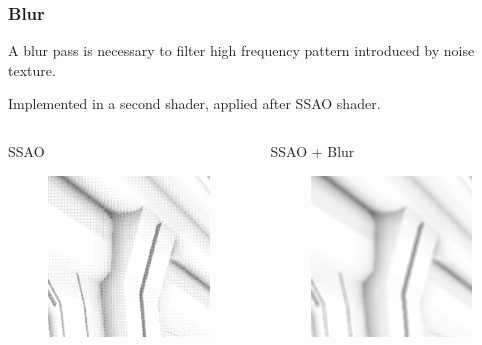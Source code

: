 \documentclass{beamer}
\newcommand{\redtext}[1]{\textcolor{myred}{#1}}
\begin{document}
\begin{frame}
\frametitle{Blur}
A blur pass is necessary to \redtext{filter} high frequency pattern introduced by noise texture.

Implemented in a second shader, applied after SSAO shader.

\vspace{0.6cm}

\begin{columns}
    \begin{column}{0.45\linewidth}
        \centering
        SSAO
        \begin{figure}
            \vspace{-1ex}%
            \includegraphics[width=0.7\linewidth]{images/no_blur.png}
        \end{figure}
    \end{column}
    
    \begin{column}{0.45\linewidth}
        \centering
        SSAO + Blur
        \begin{figure}
            \vspace{-1ex}%
            \includegraphics[width=0.7\linewidth]{images/blur.png}
        \end{figure}
    \end{column}
\end{columns}

\end{frame}
\end{document}
